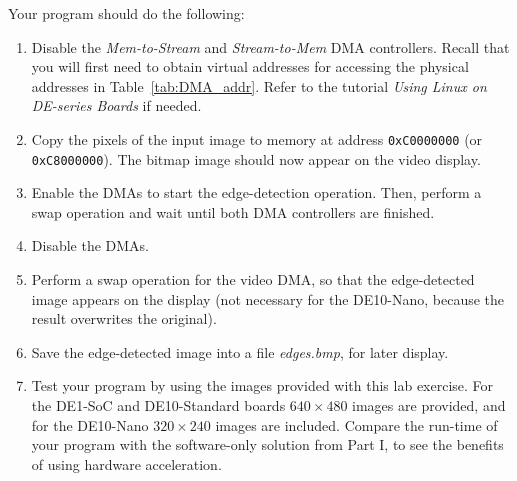 \documentclass[epsfig,10pt,fullpage]{article}
\newcommand{\CommonDocsPath}{../../common/docs}
\begin{document}
\noindent
Your program should do the following:
\begin{enumerate}
\item Disable the {\it Mem-to-Stream} and {\it Stream-to-Mem} DMA controllers. Recall that
you will first need to obtain virtual addresses for accessing the physical addresses in
Table~\ref{tab:DMA_addr}. Refer to the tutorial {\it Using Linux on DE-series Boards} if needed.
\item Copy the pixels of the input image to memory at address \texttt{0xC0000000}
(or \texttt{0xC8000000}).  The bitmap image should now appear on the video display.
\item Enable the DMAs to start the edge-detection operation. Then, perform a swap operation and 
wait until both DMA controllers are finished.
\item Disable the DMAs.
\item Perform a swap operation for the video DMA, so that the edge-detected image appears
on the display (not necessary for the DE10-Nano, because the result overwrites the original).
\item Save the edge-detected image into a file \textit{edges.bmp}, for later display. 
\item Test your program by using the images provided with this lab exercise. For the 
DE1-SoC and DE10-Standard boards $640 \times 480$ images are provided, and for the
DE10-Nano $320 \times 240$ images are included. Compare the run-time of your program with
the software-only solution from Part I, to see the benefits of using hardware acceleration.
\end{enumerate}

~\\
\noindent

\end{document}
